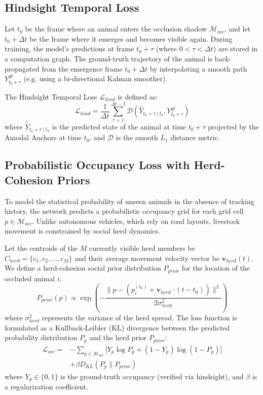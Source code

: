 \documentclass[10pt,conference,letterpaper,twocolumn]{article}
\begin{document}
\subsection{Hindsight Temporal Loss}
Let $t_0$ be the frame where an animal enters the occlusion shadow $\mathcal{M}_{occ}$, and let $t_0 + \Delta t$ be the frame where it emerges and becomes visible again. During training, the model's predictions at frame $t_0 + \tau$ (where $0 < \tau < \Delta t$) are stored in a computation graph. The ground-truth trajectory of the animal is back-propagated from the emergence frame $t_0 + \Delta t$ by interpolating a smooth path $Y_{t_0+\tau}^{gt}$ (e.g. using a bi-directional Kalman smoother).

The Hindsight Temporal Loss $\mathcal{L}_{hind}$ is defined as:
\begin{equation}
\mathcal{L}_{hind} = \frac{1}{\Delta t} \sum_{\tau=1}^{\Delta t - 1} \mathcal{D}\left( \hat{Y}_{t_0+\tau \mid t_0}, Y_{t_0+\tau}^{gt} \right)
\end{equation}
where $\hat{Y}_{t_0+\tau \mid t_0}$ is the predicted state of the animal at time $t_0+\tau$ projected by the Amodal Anchors at time $t_0$, and $\mathcal{D}$ is the smooth $L_1$ distance metric.

\subsection{Probabilistic Occupancy Loss with Herd-Cohesion Priors}
To model the statistical probability of unseen animals in the absence of tracking history, the network predicts a probabilistic occupancy grid for each grid cell $p \in \mathcal{M}_{occ}$. Unlike autonomous vehicles, which rely on road layouts, livestock movement is constrained by social herd dynamics. 

Let the centroids of the $M$ currently visible herd members be $C_{herd} = \{c_1, c_2, \dots, c_M\}$ and their average movement velocity vector be $\mathbf{v}_{herd}(t)$. We define a herd-cohesion social prior distribution $P_{prior}$ for the location of the occluded animal $i$:
\begin{equation}
P_{prior}(p) \propto \exp\left( - \frac{\|p - (p_i^{(t_0)} + \mathbf{v}_{herd} \cdot (t - t_0))\|^2}{2 \sigma_{herd}^2} \right)
\end{equation}
where $\sigma_{herd}^2$ represents the variance of the herd spread. The loss function is formulated as a Kullback-Leibler (KL) divergence between the predicted probability distribution $P_p$ and the herd prior $P_{prior}$:
\begin{align}
\mathcal{L}_{occ} = & -\sum_{p \in \mathcal{M}_{occ}} \Big[ Y_p \log P_p + (1-Y_p) \log (1-P_p) \Big] \nonumber \\
& + \beta D_{KL}\left( P_p \parallel P_{prior} \right)
\end{align}
where $Y_p \in \{0, 1\}$ is the ground-truth occupancy (verified via hindsight), and $\beta$ is a regularization coefficient.
\end{document}

